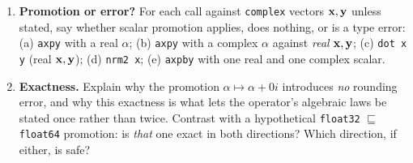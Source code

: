 \begin{enumerate}[nosep]
  \item \textbf{Promotion or error?} For each call against \texttt{complex}
  vectors $\mathbf{x},\mathbf{y}$ unless stated, say whether scalar promotion applies, does
  nothing, or is a type error: (a) \lstinline[style=l4style]|axpy| with a real
  $\alpha$; (b) \lstinline[style=l4style]|axpy| with a complex $\alpha$ against
  \emph{real} $\mathbf{x},\mathbf{y}$; (c) \lstinline[style=l4style]|dot x y| (real
  $\mathbf{x},\mathbf{y}$); (d) \lstinline[style=l4style]|nrm2 x|; (e)
  \lstinline[style=l4style]|axpby| with one real and one complex scalar.

  \item \textbf{Exactness.} Explain why the promotion $\alpha \mapsto \alpha +
  0i$ introduces \emph{no} rounding error, and why this exactness is what lets
  the operator's algebraic laws be stated once rather than twice. Contrast with
  a hypothetical \texttt{float32} $\sqsubseteq$ \texttt{float64} promotion: is
  \emph{that} one exact in both directions? Which direction, if either, is safe?
\end{enumerate}
